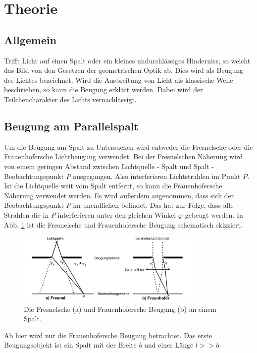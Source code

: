 \section{Theorie}
\label{sec:Theorie}

\subsection{Allgemein}
Trifft Licht auf einen Spalt oder ein kleines undurchlässiges Hinderniss, so weicht das Bild von den Gesetzen der geometrischen Optik ab.
Dies wird als Beugung des Lichtes bezeichnet.
Wird die Ausbreitung von Licht als klassische Welle beschrieben, so kann die Beugung erklärt werden.
Dabei wird der Teilchencharakter des Lichts vernachlässigt.

\subsection{Beugung am Parallelspalt}
Um die Beugung am Spalt zu Untersuchen wird entweder die Fresnelsche oder die Frauenhofersche Lichtbeugung verwendet.
Bei der Fresnelschen Näherung wird von einem geringen Abstand zwischen Lichtquelle - Spalt und Spalt - Beobachtungspunkt $P$ ausgegangen.
Also interferieren Lichtstrahlen im Punkt $P$.
\\
Ist die Lichtquelle weit vom Spalt entfernt, so kann die Frauenhofersche Näherung verwendet werden.
Es wird außerdem angenommen, dass sich der Beobachtungspunkt $P$ im unendlichen befindet.
Das hat zur Folge, dass alle Strahlen die in $P$ interferieren unter den gleichen Winkel $\varphi$ gebeugt werden.
In Abb. \ref{fig:naeherung} ist die Fresnelsche und Frauenhofersche Beugung schematisch skizziert.
\begin{figure}
    \centering
    \includegraphics[width=0.8\textwidth]{content/data/naeherung.jpg}
    \caption{Die Fresnelsche (a) und Frauenhofersche Beugung (b) an einem Spalt. \cite[2]{anleitung}}
    \label{fig:naeherung}
\end{figure}
Ab hier wird nur die Frauenhofersche Beugung betrachtet.
Das erste Beugungsobjekt ist ein Spalt mit der Breite $b$ und einer Länge $l >> b$.

